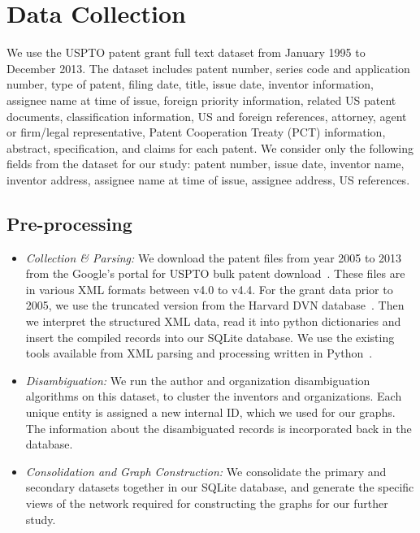 \section{Data Collection}

We use the USPTO patent grant full text dataset from January 1995 to December 
2013.  The dataset includes patent number, series code and application number,
type of patent, filing date, title, issue date, inventor information, assignee
name at time of issue, foreign priority information, related US patent
documents, classification information, US and foreign references, attorney,
agent or firm/legal representative, Patent Cooperation Treaty (PCT)
information, abstract, specification, and claims for each patent. We consider
only the following fields from the dataset for our study: patent number, issue
date, inventor name, inventor address, assignee name at time of issue, assignee address, US
references. 


\subsection{Pre-processing}

\begin{itemize}
\item {\em Collection \& Parsing:} We download the patent files from year 2005 to 2013 from the Google's portal for USPTO bulk patent download~\cite{usptodb}. These files are in various XML formats between v4.0 to v4.4. For the grant data prior to 2005, we use the truncated version from the Harvard DVN database~\cite{dvn}. Then we interpret the structured XML data, read it into python dictionaries and insert the compiled records into our SQLite database. We use the existing tools available from XML parsing and processing written in 
Python~\cite{newparser, formattingpatentdata}. 

\item {\em Disambiguation:} We run the author and organization disambiguation algorithms on this dataset, to cluster the inventors and organizations. Each unique entity is assigned a new internal ID, which we used for our graphs. The information about the disambiguated records is incorporated back in the database. 

\item {\em Consolidation and Graph Construction:} 
We consolidate the primary and secondary datasets together in our SQLite database, and generate the specific views of the network required for constructing the graphs for our further study.
\end{itemize}

